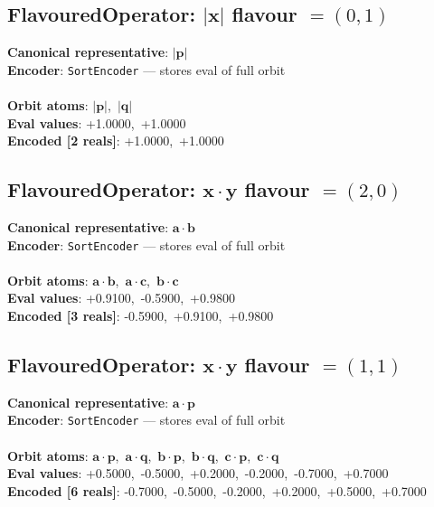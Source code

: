 \documentclass[a4paper,11pt]{article}
\newcommand{\vc}[1]{\ensuremath{\mathbf{#1}}}
\newcommand{\dnfagmiihhiejm}[1]{|\vc{#1}|}
\newcommand{\pdcegfomjfhook}[2]{\mathbf{#1} \cdot \mathbf{#2}}
\begin{document}
\subsection{FlavouredOperator: $\dnfagmiihhiejm{x}$  flavour $= (0, 1)$}
\textbf{  Canonical representative}: $\displaystyle\dnfagmiihhiejm{p}$\\
\textbf{  Encoder}: \texttt{SortEncoder} — stores eval of full orbit\\\\
\textbf{  Orbit atoms}: $\dnfagmiihhiejm{p}$,\ $\dnfagmiihhiejm{q}$\\
\textbf{  Eval values}: +1.0000,\ +1.0000\\
\textbf{  Encoded [2 reals]}: +1.0000,\ +1.0000\\

\subsection{FlavouredOperator: $\pdcegfomjfhook{x}{y}$  flavour $= (2, 0)$}
\textbf{  Canonical representative}: $\displaystyle\pdcegfomjfhook{a}{b}$\\
\textbf{  Encoder}: \texttt{SortEncoder} — stores eval of full orbit\\\\
\textbf{  Orbit atoms}: $\pdcegfomjfhook{a}{b}$,\ $\pdcegfomjfhook{a}{c}$,\ $\pdcegfomjfhook{b}{c}$\\
\textbf{  Eval values}: +0.9100,\ -0.5900,\ +0.9800\\
\textbf{  Encoded [3 reals]}: -0.5900,\ +0.9100,\ +0.9800\\

\subsection{FlavouredOperator: $\pdcegfomjfhook{x}{y}$  flavour $= (1, 1)$}
\textbf{  Canonical representative}: $\displaystyle\pdcegfomjfhook{a}{p}$\\
\textbf{  Encoder}: \texttt{SortEncoder} — stores eval of full orbit\\\\
\textbf{  Orbit atoms}: $\pdcegfomjfhook{a}{p}$,\ $\pdcegfomjfhook{a}{q}$,\ $\pdcegfomjfhook{b}{p}$,\ $\pdcegfomjfhook{b}{q}$,\ $\pdcegfomjfhook{c}{p}$,\ $\pdcegfomjfhook{c}{q}$\\
\textbf{  Eval values}: +0.5000,\ -0.5000,\ +0.2000,\ -0.2000,\ -0.7000,\ +0.7000\\
\textbf{  Encoded [6 reals]}: -0.7000,\ -0.5000,\ -0.2000,\ +0.2000,\ +0.5000,\ +0.7000\\
\end{document}
